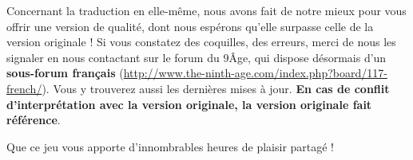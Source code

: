 {Concernant la traduction en elle-même, nous avons fait de notre mieux pour vous offrir une version de qualité, dont nous espérons qu'elle surpasse celle de la version originale ! Si vous constatez des coquilles, des erreurs, merci de nous les signaler en nous contactant sur le forum du 9\ieme Âge, qui dispose désormais d'un \textbf{sous-forum français} (\url{http://www.the-ninth-age.com/index.php?board/117-french/}). Vous y trouverez aussi les dernières mises à jour. \textbf{En cas de conflit d'interprétation avec la version originale, la version originale fait référence}.

\vspace{0.5cm}
Que ce jeu vous apporte d'innombrables heures de plaisir partagé !

\vspace{0.7cm}
\vspace{0.5cm}

}
\newcommand{\labels@secondpageannouncement}{%
	\labels@fantasybattles{} : \labels@NinthAge{} est un jeu créé et maintenu par la communauté qui met en scène des affrontements de figurines. Toutes les règles ainsi que les retours et suggestions peuvent être trouvées ou donnés sur le site :
	\newline\url{http://www.the-ninth-age.com/}
}
\newcommand{\labels@rulechanges}{%
	Les changements de règles entre versions sont colorés comme ce paragraphe. Une liste de ces changements par version en anglais est ajouté à la fin de cet ouvrage.
}
\newcommand{\labels@latexcredit}{Document réalisé à l'aide de \LaTeX .}



\newcommand{\free}{gratuit}
\newcommand{\upto}{jusqu'à}
\newcommand{\Upto}{Jusqu'à}
\newcommand{\unlimited}{sans limite de pts}
\newcommand{\permodel}{/fig}
\newcommand{\listlastchoice}{, ou}
\newcommand{\notif}[1]{(pas #1)}
\newcommand{\wordand}{et}
\newcommand{\wordwith}{avec}
\newcommand{\ifNmodelsorless}[1]{(#1 figurines ou moins)}
\newcommand{\unitwith}{unité avec}
\newcommand{\From}{De} %
\newcommand{\wordto}{à}
\newcommand{\wordAll}{Tous}
\newcommand{\spacebeforecolon}{ } %


